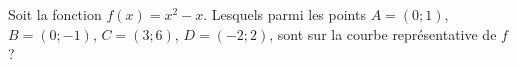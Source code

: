 
\begin{exercice}\label{exoSeconde-0049}

    Soit la fonction \( f(x)=x^2-x\). Lesquels parmi les points \( A=(0;1)\), \( B=(0;-1)\), \( C=(3;6)\), \( D=(-2;2)\), sont sur la courbe représentative de \( f\) ?

\end{exercice}

